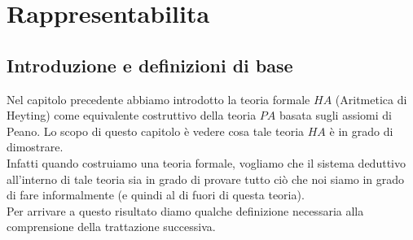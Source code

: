 \chapter{Rappresentabilita}


\section{Introduzione e definizioni di base}

Nel capitolo precedente abbiamo introdotto la teoria formale $HA$ (Aritmetica di Heyting) come equivalente costruttivo della teoria $PA$ basata sugli assiomi di Peano. Lo scopo di questo capitolo \`e vedere cosa tale teoria $HA$ \`e in grado di dimostrare.\\
Infatti quando costruiamo una teoria formale, vogliamo che il sistema deduttivo all'interno di tale teoria sia in grado di provare tutto ci\`o che noi siamo in grado di fare informalmente (e quindi al di fuori di questa teoria).\\
Per arrivare a questo risultato diamo qualche definizione necessaria alla comprensione della trattazione successiva.\\

